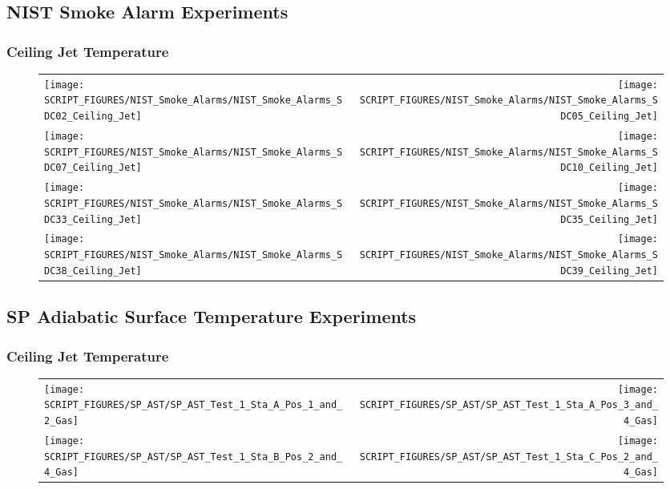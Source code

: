\clearpage

\subsection{NIST Smoke Alarm Experiments}

\subsubsection{Ceiling Jet Temperature}

\begin{figure}[!ht]
\begin{tabular*}{\textwidth}{l@{\extracolsep{\fill}}r}
\texttt{[image: SCRIPT\_FIGURES/NIST\_Smoke\_Alarms/NIST\_Smoke\_Alarms\_SDC02\_Ceiling\_Jet]} &
\texttt{[image: SCRIPT\_FIGURES/NIST\_Smoke\_Alarms/NIST\_Smoke\_Alarms\_SDC05\_Ceiling\_Jet]} \\
\texttt{[image: SCRIPT\_FIGURES/NIST\_Smoke\_Alarms/NIST\_Smoke\_Alarms\_SDC07\_Ceiling\_Jet]} &
\texttt{[image: SCRIPT\_FIGURES/NIST\_Smoke\_Alarms/NIST\_Smoke\_Alarms\_SDC10\_Ceiling\_Jet]} \\
\texttt{[image: SCRIPT\_FIGURES/NIST\_Smoke\_Alarms/NIST\_Smoke\_Alarms\_SDC33\_Ceiling\_Jet]} &
\texttt{[image: SCRIPT\_FIGURES/NIST\_Smoke\_Alarms/NIST\_Smoke\_Alarms\_SDC35\_Ceiling\_Jet]} \\
\texttt{[image: SCRIPT\_FIGURES/NIST\_Smoke\_Alarms/NIST\_Smoke\_Alarms\_SDC38\_Ceiling\_Jet]} &
\texttt{[image: SCRIPT\_FIGURES/NIST\_Smoke\_Alarms/NIST\_Smoke\_Alarms\_SDC39\_Ceiling\_Jet]}
\end{tabular*}
\label{NIST_Smoke_Alarms_Ceiling_Jet}
\end{figure}

\clearpage

\subsection{SP Adiabatic Surface Temperature Experiments}

\subsubsection{Ceiling Jet Temperature}

\begin{figure}[!ht]
\begin{tabular*}{\textwidth}{l@{\extracolsep{\fill}}r}
\texttt{[image: SCRIPT\_FIGURES/SP\_AST/SP\_AST\_Test\_1\_Sta\_A\_Pos\_1\_and\_2\_Gas]} &
\texttt{[image: SCRIPT\_FIGURES/SP\_AST/SP\_AST\_Test\_1\_Sta\_A\_Pos\_3\_and\_4\_Gas]} \\
\texttt{[image: SCRIPT\_FIGURES/SP\_AST/SP\_AST\_Test\_1\_Sta\_B\_Pos\_2\_and\_4\_Gas]} &
\texttt{[image: SCRIPT\_FIGURES/SP\_AST/SP\_AST\_Test\_1\_Sta\_C\_Pos\_2\_and\_4\_Gas]}
\end{tabular*}
\label{SP_Test_1_Gas}
\end{figure}

